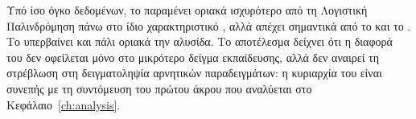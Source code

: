 Υπό ίσο όγκο δεδομένων, το  παραμένει οριακά ισχυρότερο από τη
Λογιστική Παλινδρόμηση πάνω στο ίδιο χαρακτηριστικό , αλλά απέχει
σημαντικά από το  και το . Το  υπερβαίνει και
πάλι οριακά την αλυσίδα. Το αποτέλεσμα δείχνει ότι η διαφορά του  δεν
οφείλεται μόνο στο μικρότερο δείγμα εκπαίδευσης, αλλά δεν αναιρεί τη στρέβλωση στη
δειγματοληψία αρνητικών παραδειγμάτων: η κυριαρχία του  είναι συνεπής με τη
συντόμευση του πρώτου άκρου που αναλύεται στο Κεφάλαιο~\ref{ch:analysis}.
